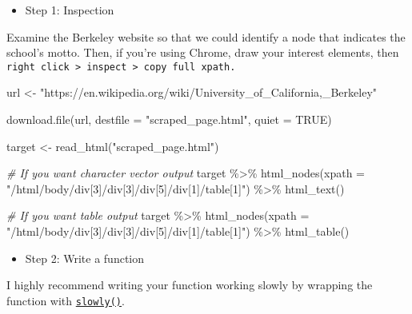 \documentclass[
]{book}
\newenvironment{Shaded}{\begin{snugshade}}{\end{snugshade}}
\newcommand{\AttributeTok}[1]{\textcolor[rgb]{0.77,0.63,0.00}{#1}}
\newcommand{\CommentTok}[1]{\textcolor[rgb]{0.56,0.35,0.01}{\textit{#1}}}
\newcommand{\ConstantTok}[1]{\textcolor[rgb]{0.00,0.00,0.00}{#1}}
\newcommand{\FunctionTok}[1]{\textcolor[rgb]{0.00,0.00,0.00}{#1}}
\newcommand{\NormalTok}[1]{#1}
\newcommand{\OtherTok}[1]{\textcolor[rgb]{0.56,0.35,0.01}{#1}}
\newcommand{\SpecialCharTok}[1]{\textcolor[rgb]{0.00,0.00,0.00}{#1}}
\newcommand{\StringTok}[1]{\textcolor[rgb]{0.31,0.60,0.02}{#1}}
\providecommand{\tightlist}{%
  \setlength{\itemsep}{0pt}\setlength{\parskip}{0pt}}
\begin{document}
\begin{itemize}
\tightlist
\item
  Step 1: Inspection
\end{itemize}

Examine the Berkeley website so that we could identify a node that indicates the school's motto. Then, if you're using Chrome, draw your interest elements, then \texttt{right\ click\ \textgreater{}\ inspect\ \textgreater{}\ copy\ full\ xpath.}

\begin{Shaded}
\begin{Highlighting}[]
\NormalTok{url }\OtherTok{\textless{}{-}} \StringTok{"https://en.wikipedia.org/wiki/University\_of\_California,\_Berkeley"}

\FunctionTok{download.file}\NormalTok{(url, }\AttributeTok{destfile =} \StringTok{"scraped\_page.html"}\NormalTok{, }\AttributeTok{quiet =} \ConstantTok{TRUE}\NormalTok{)}

\NormalTok{target }\OtherTok{\textless{}{-}} \FunctionTok{read\_html}\NormalTok{(}\StringTok{"scraped\_page.html"}\NormalTok{)}

\CommentTok{\# If you want character vector output}
\NormalTok{target }\SpecialCharTok{\%\textgreater{}\%}
  \FunctionTok{html\_nodes}\NormalTok{(}\AttributeTok{xpath =} \StringTok{"/html/body/div[3]/div[3]/div[5]/div[1]/table[1]"}\NormalTok{) }\SpecialCharTok{\%\textgreater{}\%}
  \FunctionTok{html\_text}\NormalTok{() }

\CommentTok{\# If you want table output }
\NormalTok{target }\SpecialCharTok{\%\textgreater{}\%}
  \FunctionTok{html\_nodes}\NormalTok{(}\AttributeTok{xpath =} \StringTok{"/html/body/div[3]/div[3]/div[5]/div[1]/table[1]"}\NormalTok{) }\SpecialCharTok{\%\textgreater{}\%}
  \FunctionTok{html\_table}\NormalTok{()}
\end{Highlighting}
\end{Shaded}

\begin{itemize}
\tightlist
\item
  Step 2: Write a function
\end{itemize}

I highly recommend writing your function working slowly by wrapping the function with \href{https://purrr.tidyverse.org/reference/insistently.html}{\texttt{slowly()}}.
\end{document}
